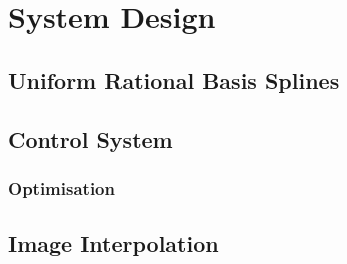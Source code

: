 \chapter{System Design}


\section{Uniform Rational Basis Splines}




\section{Control System}

\subsection{Optimisation}







\section{Image Interpolation}